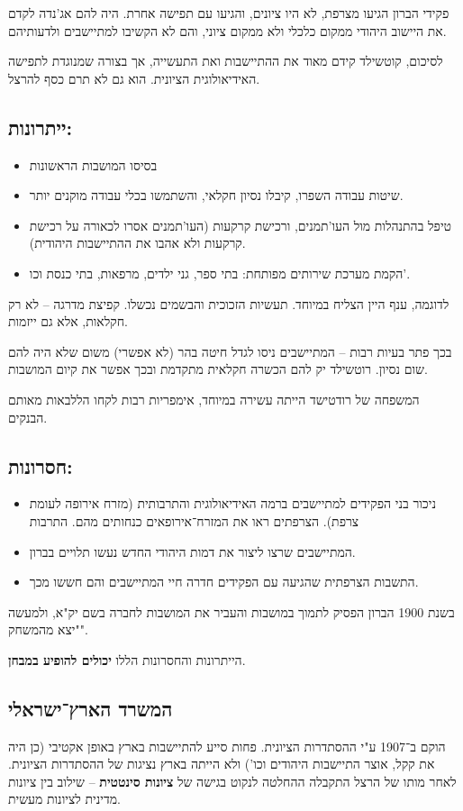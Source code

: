 \documentclass[a4paper]{book}
\begin{document}
	פקידי הברון הגיעו מצרפת, לא היו ציונים, והגיעו עם תפישה אחרת. היה להם אג'נדה לקדם את היישוב היהודי ממקום כלכלי ולא ממקום ציוני, והם לא הקשיבו למתיישבים ולדעותיהם. 
	
	לסיכום, קוטשילד קידם מאוד את ההתיישבות ואת התעשייה, אך בצורה שמנוגדת לתפישה האידיאולוגית הציונית. הוא גם לא תרם כסף להרצל. 
	\subsection{ייתרונות: }
	\begin{itemize}
		\item בסיסו המושבות הראשונות
		\item שיטות עבודה השפרו, קיבלו נסיון חקלאי, והשתמשו בכלי עבודה מוקנים יותר. 
		\item טיפל בהתנהלות מול העו'תמנים, ורכישת קרקעות (העו'תמנים אסרו לכאורה על רכישת קרקעות ולא אהבו את ההתיישבות היהודית). 
		\item הקמת מערכת שירותים מפותחת: בתי ספר, גני ילדים, מרפאות, בתי כנסת וכו'. 
	\end{itemize}
	
	לדוגמה, ענף היין הצליח במיוחד. תעשיות הזכוכית והבשמים נכשלו. קפיצת מדרגה – לא רק חקלאות, אלא גם ייזמות. 
	
	בכך פתר בעיות רבות – המתיישבים ניסו לגדל חיטה בהר (לא אפשרי) משום שלא היה להם שום נסיון. רוטשילד יק להם הכשרה חקלאית מתקדמת ובכך אפשר את קיום המושבות. 
	
	המשפחה של רודטישד הייתה עשירה במיוחד, אימפריות רבות לקחו הללבאות מאותם הבנקים. 
	
	\subsection{חסרונות: }
	\begin{itemize}
		\item ניכור בני הפקידים למתיישבים ברמה האידיאולוגית והתרבותית (מזרח אירופה לעומת צרפת). הצרפתים ראו את המזרח־אירופאים כנחותים מהם. התרבות 
		\item המתיישבים שרצו ליצור את דמות היהודי החדש נעשו תלויים בברון. 
		\item התשבות הצרפתית שהגיעה עם הפקידים חדרה חיי המתיישבים והם חששו מכך. 
	\end{itemize}
	
	בשנת 1900 הברון הפסיק לתמוך במושבות והעביר את המושבות לחברה בשם יק"א, ולמעשה "יצא מהמשחק". 
	
	הייתרונות והחסרונות הללו \textbf{יכולים להופיע במבחן}. 
	
	\subsection{המשרד הארץ־ישראלי} 
	הוקם ב־1907 ע"י ההסתדרות הציונית. 
	פחות סייע להתיישבות בארץ באופן אקטיבי (כן היה את קקל, אוצר התיישבות היהודים וכו') ולא הייתה בארץ נציגות של ההסתדרות הציונית. לאחר מותו של הרצל התקבלה ההחלטה לנקוט בגישה של \textbf{ציונות סינטטית} – שילוב בין ציונות מדינית לציונות מעשית. 
	
\end{document}
